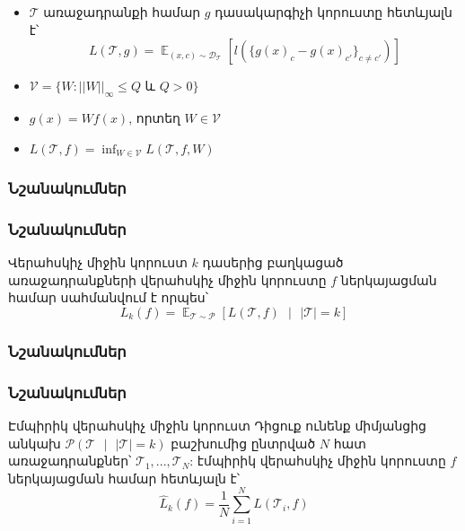 \documentclass[10pt]{beamer}
\DeclareMathOperator*{\E}{\mathbb{E}}
\begin{document}
\begin{frame}[t]
\frametitle{}
\begin{itemize}
\vspace{5mm}
\item \armfont $\mathcal{T}$ առաջադրանքի համար $g$ դասակարգիչի կորուստը հետևյալն է՝
$$L(\mathcal{T}, g) = \E_{(x, c) \sim \mathcal{D}_{\mathcal{T}}} \left [ l(\{ g(x)_c-g(x)_{c'}\}_{c \neq c'}  ) \right ]$$
\item $\mathcal{V} = \{W: ||W||_{\infty} \leq Q \text{ և } Q > 0\}$
\item  $g(x) = Wf(x)$, որտեղ $W \in \mathcal{V}$

\item $L(\mathcal{T}, f) = \inf_{W \in \mathcal{V}} L(\mathcal{T}, f, W)$

\end{itemize}
\end{frame}


\begin{frame}
\frametitle{\armfont Նշանակումներ}
\end{frame}


\begin{frame}
\frametitle{\armfont Նշանակումներ}

\begin{block}{\armfont Վերահսկիչ միջին կորուստ}
\armfont \fontsize{8pt}{8pt}
$k$ դասերից բաղկացած առաջադրանքների վերահսկիչ միջին կորուստը $f$ ներկայացման համար սահմանվում է որպես՝ 
$$L_k(f) = \E_{\mathcal{T} \sim \mathcal{P}} \left [L (\mathcal{T}, f) \text{ } | \text{ } |\mathcal{T}| = k\right]$$
\end{block}

\end{frame}

\begin{frame}
\frametitle{\armfont Նշանակումներ}
\end{frame}

\begin{frame}
\frametitle{\armfont Նշանակումներ}

\begin{block}{\armfont Էմպիրիկ վերահսկիչ միջին կորուստ}
\armfont \fontsize{8pt}{8pt} Դիցուք ունենք միմյանցից անկախ $\mathcal{P}(\mathcal{T} \text{ } |\text{ }  |\mathcal{T}| = k )$ բաշխումից ընտրված $N$ հատ առաջադրանքներ՝ $\mathcal{T}_1, ..., \mathcal{T}_N$:
էմպիրիկ վերահսկիչ միջին կորուստը $f$ ներկայացման համար հետևյալն է՝ 
$$\hat{L}_k(f) = \frac{1}{N}\sum_{i=1}^{N}L (\mathcal{T}_i, f)$$
\end{block}

\end{frame}
\end{document}
